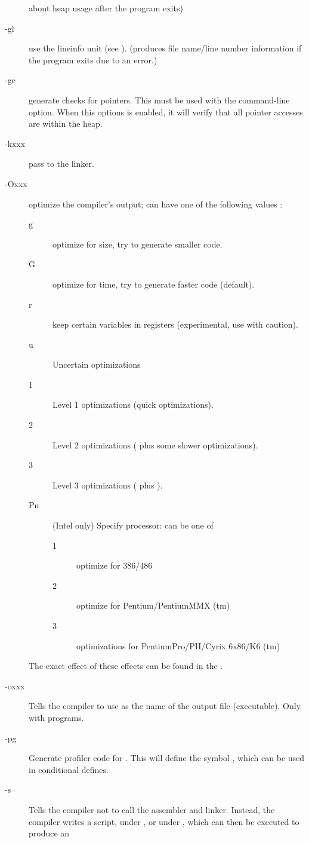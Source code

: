 \begin{description}
about heap usage after the program exits)
\item [-gl] use the lineinfo unit (see \unitsref). (produces file
name/line number information if the program exits due to an error.)
\item [-gc] generate checks for pointers. This must be used with the
 command-line option. When this options is enabled, it will verify 
that all pointer accesses are within the heap.
\item[-kxxx] pass  to the linker. 
\item[-Oxxx]  optimize the compiler's output;  can have one
of the following values :
\begin{description}
\item[g] optimize for size, try to generate smaller code.
\item[G] optimize for time, try to generate faster code (default).
\item[r] keep certain variables in registers (experimental, use with
caution).
\item[u] Uncertain optimizations
\item[1] Level 1 optimizations (quick optimizations).
\item[2] Level 2 optimizations ( plus some slower optimizations).
\item[3] Level 3 optimizations ( plus ).
\item[Pn] (Intel only) Specify processor:  can be one of
\begin{description}
\item[1] optimize for 386/486
\item[2] optimize for Pentium/PentiumMMX (tm)
\item[3] optimizations for PentiumPro/PII/Cyrix 6x86/K6 (tm)
\end{description}
\end{description}
The exact effect of these effects can be found in the \progref.
\item [-oxxx] Tells the compiler to use  as the name of the output
file (executable). Only with programs.
\item [-pg]  Generate profiler code for . This will
define the symbol , which can be used in conditional
defines.
\item [-s]  Tells the compiler not to call the assembler and linker.
Instead, the compiler writes a script,  under \dos, or
 under \linux, which can then be executed to produce an

\end{description}
